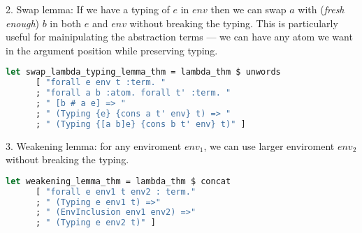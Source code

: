 \documentclass[english, mgr]{iithesis}
\begin{document}
2. Swap lemma:
If we have a typing of $e$ in $env$ then we can
swap $a$ with (\textit{fresh enough}) $b$ in both $e$ and $env$ without breaking the typing.
This is particularly useful for mainipulating the abstraction terms ---
we can have any atom we want in the argument position while preserving typing.
\begin{lstlisting}[language=OCaml]
let swap_lambda_typing_lemma_thm = lambda_thm $ unwords
      [ "forall e env t :term. "
      ; "forall a b :atom. forall t' :term. "
      ; " [b # a e] => "
      ; " (Typing {e} {cons a t' env} t) => "
      ; " (Typing {[a b]e} {cons b t' env} t)" ]
\end{lstlisting}

3. Weakening lemma: for any enviroment $env_1$, we can use larger enviroment $env_2$ without breaking the typing.
\begin{lstlisting}[language=OCaml]
let weakening_lemma_thm = lambda_thm $ concat
      [ "forall e env1 t env2 : term."
      ; " (Typing e env1 t) =>"
      ; " (EnvInclusion env1 env2) =>"
      ; " (Typing e env2 t)" ]
\end{lstlisting}
\end{document}
